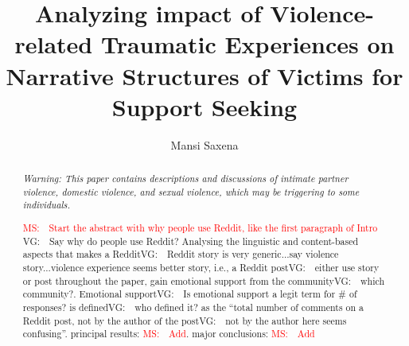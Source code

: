 \documentclass[11pt]{article}
\newcommand{\ms}[1]{\textcolor{red}{{MS:~~#1}}}
\newcommand{\vg}[1]{\textcolor{green!50!black}{{VG:~~#1}}}
\begin{document}
\let\WriteBookmarks\relax
\def\floatpagepagefraction{1}
\def\textpagefraction{.001}

\title{Analyzing impact of Violence-related Traumatic Experiences on Narrative Structures of Victims for Support Seeking} \date{}


\author{Mansi Saxena}










\maketitle

\begin{abstract}
\textit{Warning: This paper contains descriptions and discussions of intimate partner violence, domestic violence, and sexual violence, which may be triggering to some individuals. }

\ms{Start the abstract with why people use Reddit, like the first paragraph of Intro}
\vg{Say why do people use Reddit?}
Analysing the linguistic and content-based aspects that makes a Reddit\vg{Reddit story is very generic...say violence story...violence experience seems better} story, i.e., a Reddit post\vg{either use story or post throughout the paper}, gain emotional support from the community\vg{which community?}. Emotional support\vg{Is emotional support a legit term for \# of responses?} is defined\vg{who defined it?} as the ``total number of comments on a Reddit post, not by the author of the post\vg{not by the author here seems confusing}''. principal results: \ms{Add}. major conclusions: \ms{Add}

\end{abstract}
\end{document}
